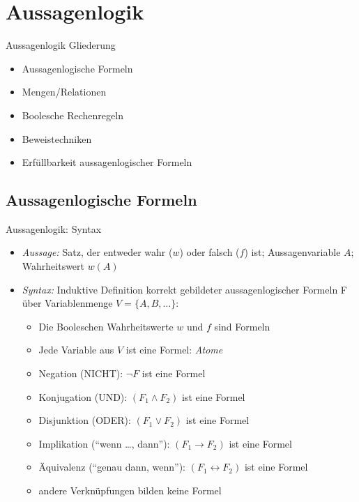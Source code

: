 \section{Aussagenlogik}
\begin{frame}{Aussagenlogik}
	Gliederung
	\begin{itemize}
		\item Aussagenlogische Formeln
		\item Mengen/Relationen
		\item Boolesche Rechenregeln
		\item Beweistechniken
		\item Erfüllbarkeit aussagenlogischer Formeln
	\end{itemize}
\end{frame}

\subsection{Aussagenlogische Formeln}

\begin{frame}{Aussagenlogik: Syntax}
	\begin{itemize}
		\item \emph{Aussage:} Satz, der entweder wahr ($w$) oder falsch ($f$) ist; Aussagenvariable $A$; Wahrheitswert $w(A)$
		\item \emph{Syntax:} Induktive Definition korrekt gebildeter aussagenlogischer Formeln F über Variablenmenge $V=\{A, B, \ldots\}$:
		\begin{itemize}
			\item Die Booleschen Wahrheitswerte $w$ und $f$ sind Formeln
			\item Jede Variable aus $V$ ist eine Formel: \emph{Atome}
			\item Negation (NICHT): $\neg F$ ist eine Formel
			\item Konjugation (UND): $(F_1 \land F_2)$ ist eine Formel
			\item Disjunktion (ODER): $(F_1 \lor F_2)$ ist eine Formel
			\item Implikation ("`wenn \ldots, dann"'): $(F_1 \rightarrow F_2)$ ist eine Formel
			\item Äquivalenz ("`genau dann, wenn"'): $(F_1 \leftrightarrow F_2)$ ist eine Formel
			\item andere Verknüpfungen bilden keine Formel
		\end{itemize}
	\end{itemize}
\end{frame}

